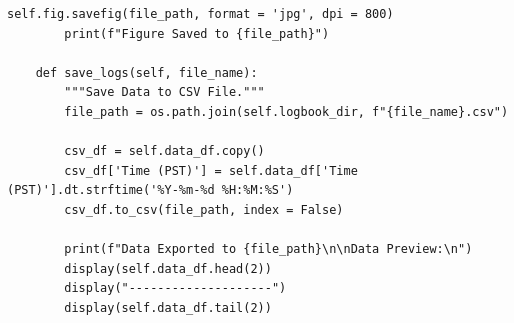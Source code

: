 \documentclass{article}
\begin{document}
\begin{lstlisting}[caption={Python Stripchart}, label={lst:stripchart_code}]
        self.fig.savefig(file_path, format = 'jpg', dpi = 800)
        print(f"Figure Saved to {file_path}")

    def save_logs(self, file_name):
        """Save Data to CSV File."""
        file_path = os.path.join(self.logbook_dir, f"{file_name}.csv")

        csv_df = self.data_df.copy()
        csv_df['Time (PST)'] = self.data_df['Time (PST)'].dt.strftime('%Y-%m-%d %H:%M:%S')
        csv_df.to_csv(file_path, index = False)

        print(f"Data Exported to {file_path}\n\nData Preview:\n")
        display(self.data_df.head(2))
        display("--------------------")
        display(self.data_df.tail(2))
\end{lstlisting}
\end{document}
